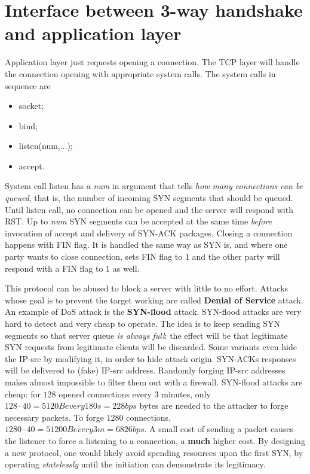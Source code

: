 \documentclass[a4paper, 11pt]{report}
\begin{document}
\section{Interface between 3-way handshake and application layer}

Application layer just requests opening a connection. The TCP layer will handle
the connection opening with appropriate system calls. The system calls in sequence are

\begin{itemize}
	\item socket;
    \item bind;
    \item listen(num,...);
    \item accept.
\end{itemize}

System call listen has a \emph{num} in argument that tells \emph{how many
connections can be queued}, that is, the number of incoming SYN segments that
should be queued. Until listen call, no connection can be opened and the server
will respond with RST. Up to \emph{num} SYN segments can be accepted at the
same time \emph{before} invocation of accept and delivery of SYN-ACK packages.
Closing a connection happens with FIN flag. It is handled the same way as SYN
is, and where one party wants to close connection, sets FIN flag to $1$ and the
other party will respond with a FIN flag to $1$ as well.

This protocol can be abused to block a server with little to no effort. Attacks
whose goal is to prevent the target working are called \textbf{Denial of
Service} attack. An example of DoS attack is the \textbf{SYN-flood} attack.
SYN-flood attacks are very hard to detect and very cheap to operate. The idea
is to keep sending SYN segments so that server queue \emph{is always full}: the
effect will be that legitimate SYN requests from legitimate clients will be
discarded. Some variants even hide the IP-src by modifying it, in order to hide
attack origin. SYN-ACKs responses will be delivered to (fake) IP-src address.
Randomly forging IP-src addresses makes almost impossible to filter them out
with a firewall. SYN-flood attacks are cheap: for $128$ opened connections
every $3$ minutes, only $128\cdot 40 = 5120B every 180s = 228 bps$ bytes are
needed to the attacker to forge necessary packets. To forge $1280$ connections,
$1280\cdot 40 = 51200B every 3 m = 6826bps.$ A small cost of sending a packet
causes the listener to force a listening to a connection, a \textbf{much}
higher cost. By designing a new protocol, one would likely avoid spending
resources upon the first SYN, by operating \emph{statelessly} until the
initiation can demonstrate its legitimacy.
\end{document}
